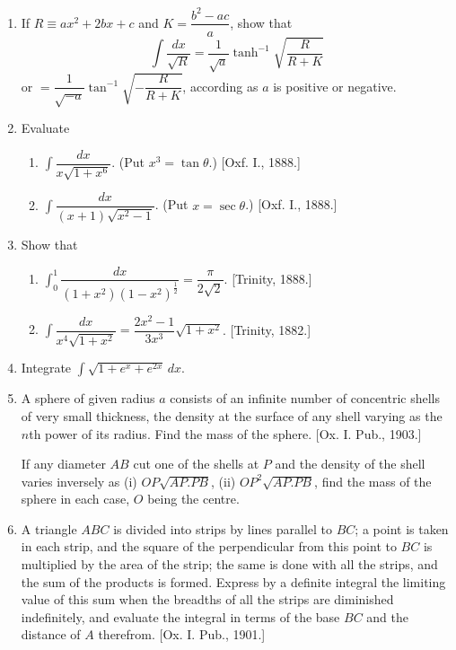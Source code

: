 \documentclass[11pt, a4paper]{article}
\newcommand{\source}[1]{\hfill\textnormal{[#1]}}
\begin{document}
\begin{enumerate}[leftmargin=2em]
\item If $R\equiv ax^2+2bx+c$ and $K=\dfrac{b^2-ac}{a}$, show that
\[
\int \dfrac{dx}{\sqrt R}=\dfrac{1}{\sqrt a}\tanh^{-1}\sqrt{\dfrac{R}{R+K}}
\]
or $=\dfrac{1}{\sqrt{-a}}\tan^{-1}\sqrt{-\dfrac{R}{R+K}}$,
according as $a$ is positive or negative.

\item Evaluate
\begin{enumerate}[label=(\roman*)]
\item $\displaystyle\int \dfrac{dx}{x\sqrt{1+x^6}}$. (Put $x^3=\tan\theta$.) \source{Oxf. I., 1888.}
\item $\displaystyle\int \dfrac{dx}{(x+1)\sqrt{x^2-1}}$. (Put $x=\sec\theta$.) \source{Oxf. I., 1888.}
\end{enumerate}

\item Show that
\begin{enumerate}[label=(\roman*)]
\item $\displaystyle\int_0^1 \dfrac{dx}{(1+x^2)(1-x^2)^{\frac12}}=\dfrac{\pi}{2\sqrt2}$. \source{Trinity, 1888.}
\item $\displaystyle\int \dfrac{dx}{x^4\sqrt{1+x^2}}=\dfrac{2x^2-1}{3x^3}\sqrt{1+x^2}$. \source{Trinity, 1882.}
\end{enumerate}

\item Integrate $\displaystyle\int \sqrt{1+e^x+e^{2x}}\,dx$.

\item A sphere of given radius $a$ consists of an infinite number of concentric shells of very small thickness, the density at the surface of any shell varying as the $n$th power of its radius. Find the mass of the sphere. \source{Ox. I. Pub., 1903.}

If any diameter $AB$ cut one of the shells at $P$ and the density of the shell varies inversely as (i) $OP\sqrt{AP.PB}$, (ii) $OP^2\sqrt{AP.PB}$, find the mass of the sphere in each case, $O$ being the centre.

\item A triangle $ABC$ is divided into strips by lines parallel to $BC$; a point is taken in each strip, and the square of the perpendicular from this point to $BC$ is multiplied by the area of the strip; the same is done with all the strips, and the sum of the products is formed. Express by a definite integral the limiting value of this sum when the breadths of all the strips are diminished indefinitely, and evaluate the integral in terms of the base $BC$ and the distance of $A$ therefrom. \source{Ox. I. Pub., 1901.}


\end{enumerate}
\end{document}
